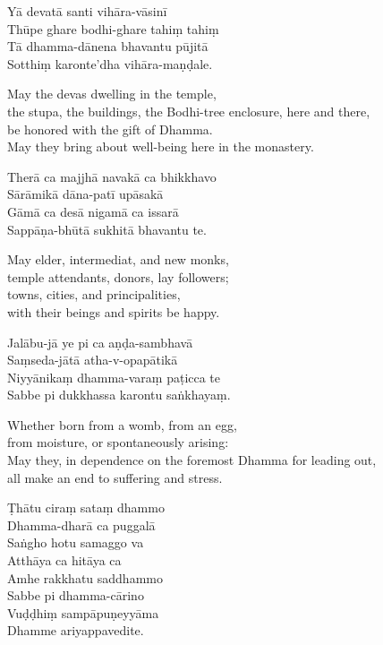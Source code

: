 
Yā devatā santi vihāra-vāsinī\\
Thūpe ghare bodhi-ghare tahiṃ tahiṃ\\
Tā dhamma-dānena bhavantu pūjitā\\
Sotthiṃ karonte'dha vihāra-maṇḍale.

\begin{english}
  May the devas dwelling in the temple,\\
  the stupa, the buildings, the Bodhi-tree enclosure, here and there,\\
  be honored with the gift of Dhamma.\\
  May they bring about well-being here in the monastery.
\end{english}

Therā ca majjhā navakā ca bhikkhavo\\
Sārāmikā dāna-patī upāsakā\\
Gāmā ca desā nigamā ca issarā\\
Sappāṇa-bhūtā sukhitā bhavantu te.

\begin{english}
  May elder, intermediat, and new monks,\\
  temple attendants, donors, lay followers;\\
  towns, cities, and principalities,\\
  with their beings and spirits be happy.
\end{english}

Jalābu-jā ye pi ca aṇḍa-sambhavā\\
Saṃseda-jātā atha-v-opapātikā\\
Niyyānikaṃ dhamma-varaṃ paṭicca te\\
Sabbe pi dukkhassa karontu saṅkhayaṃ.

\begin{english}
  Whether born from a womb, from an egg,\\
  from moisture, or spontaneously arising:\\
  May they, in dependence on the foremost Dhamma for leading out,\\
  all make an end to suffering and stress.
\end{english}

Ṭhātu ciraṃ sataṃ dhammo\\
Dhamma-dharā ca puggalā\\
Saṅgho hotu samaggo va\\
Atthāya ca hitāya ca\\
Amhe rakkhatu saddhammo\\
Sabbe pi dhamma-cārino\\
Vuḍḍhiṃ sampāpuṇeyyāma\\
Dhamme ariyappavedite.

